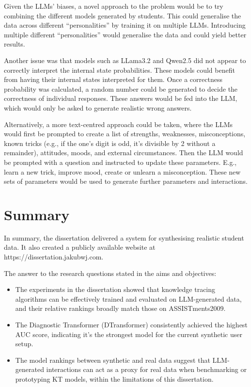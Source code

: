 Given the LLMs' biases, a novel approach to the problem would be to try combining the different models generated by students. This could generalise the data across different ``personalities'' by training it on multiple LLMs. Introducing multiple different ``personalities'' would generalise the data and could yield better results.

Another issue was that models such as LLama3.2 and Qwen2.5 did not appear to correctly interpret the internal state probabilities. These models could benefit from having their internal states interpreted for them. Once a correctness probability was calculated, a random number could be generated to decide the correctness of individual responses. These answers would be fed into the LLM, which would only be asked to generate realistic wrong answers.

Alternatively, a more text-centred approach could be taken, where the LLMs would first be prompted to create a list of strengths, weaknesses, misconceptions, known tricks (e.g., if the one's digit is odd, it's divisible by 2 without a remainder), attitudes, moods, and external circumstances. Then the LLM would be prompted with a question and instructed to update these parameters. E.g., learn a new trick, improve mood, create or unlearn a misconception. These new sets of parameters would be used to generate further parameters and interactions.

\section{Summary}

In summary, the dissertation delivered a system for synthesising realistic student data. It also created a publicly available website at https://dissertation.jakubwj.com.

The answer to the research questions stated in the aims and objectives:

\begin{itemize}

    \item The experiments in the dissertation showed that knowledge tracing algorithms can be effectively trained and evaluated on LLM-generated data, and their relative rankings broadly match those on ASSISTments2009.

    \item The Diagnostic Transformer (DTransformer) consistently achieved the highest AUC score, indicating it’s the strongest model for the current synthetic user setup.

    \item The model rankings between synthetic and real data suggest that LLM-generated interactions can act as a proxy for real data when benchmarking or prototyping KT models, within the limitations of this dissertation.

\end{itemize}


